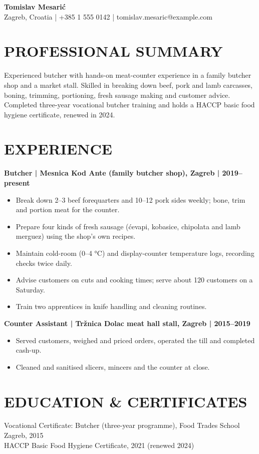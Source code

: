 \documentclass[11pt,a4paper]{article}
\begin{document}
\begin{center}
{\LARGE\bfseries\color{primarycolor} Tomislav Mesarić}\\[0.35em]
Zagreb, Croatia | +385 1 555 0142 | tomislav.mesaric@example.com
\end{center}

\section*{PROFESSIONAL SUMMARY}
Experienced butcher with hands-on meat-counter experience in a family butcher shop and a market stall. Skilled in breaking down beef, pork and lamb carcasses, boning, trimming, portioning, fresh sausage making and customer advice. Completed three-year vocational butcher training and holds a HACCP basic food hygiene certificate, renewed in 2024.

\section*{EXPERIENCE}
\textbf{Butcher | Mesnica Kod Ante (family butcher shop), Zagreb | 2019–present}
\begin{itemize}
\item Break down 2–3 beef forequarters and 10–12 pork sides weekly; bone, trim and portion meat for the counter.
\item Prepare four kinds of fresh sausage (ćevapi, kobasice, chipolata and lamb merguez) using the shop's own recipes.
\item Maintain cold-room (0–4 °C) and display-counter temperature logs, recording checks twice daily.
\item Advise customers on cuts and cooking times; serve about 120 customers on a Saturday.
\item Train two apprentices in knife handling and cleaning routines.
\end{itemize}

\textbf{Counter Assistant | Tržnica Dolac meat hall stall, Zagreb | 2015–2019}
\begin{itemize}
\item Served customers, weighed and priced orders, operated the till and completed cash-up.
\item Cleaned and sanitised slicers, mincers and the counter at close.
\end{itemize}

\section*{EDUCATION & CERTIFICATES}
Vocational Certificate: Butcher (three-year programme), Food Trades School Zagreb, 2015\\
HACCP Basic Food Hygiene Certificate, 2021 (renewed 2024)
\end{document}
